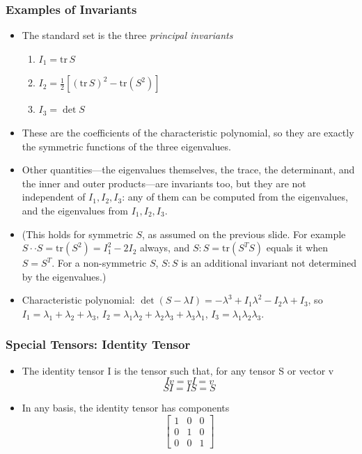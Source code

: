 \documentclass[aspectratio=169,11pt]{beamer}
\begin{document}
\begin{frame}
\frametitle{Examples of Invariants}
\begin{itemize}
    \item The standard set is the three \emph{principal invariants}
    \begin{enumerate}
        \item \(I_1 = \mathrm{tr}\,S\)
        \item \(I_2 = \tfrac{1}{2}\left[(\mathrm{tr}\,S)^2 - \mathrm{tr}(S^2)\right]\)
        \item \(I_3 = \det S\)
    \end{enumerate}
    \item These are the coefficients of the characteristic polynomial, so they are exactly the symmetric functions of the three eigenvalues.
    \item Other quantities—the eigenvalues themselves, the trace, the determinant, and the inner and outer products—are invariants too, but they are not independent of \(I_1, I_2, I_3\): any of them can be computed from the eigenvalues, and the eigenvalues from \(I_1, I_2, I_3\).
    \item (This holds for symmetric \(S\), as assumed on the previous slide. For example \(S\cdot\cdot S = \mathrm{tr}(S^2) = I_1^2 - 2I_2\) always, and \(S:S = \mathrm{tr}(S^TS)\) equals it when \(S=S^T\). For a non-symmetric \(S\), \(S:S\) is an additional invariant not determined by the eigenvalues.)
    \item Characteristic polynomial: \(\det(S-\lambda I) = -\lambda^3 + I_1\lambda^2 - I_2\lambda + I_3\), so \(I_1=\lambda_1+\lambda_2+\lambda_3\), \(I_2=\lambda_1\lambda_2+\lambda_2\lambda_3+\lambda_3\lambda_1\), \(I_3=\lambda_1\lambda_2\lambda_3\).
\end{itemize}
\end{frame}

\begin{frame}
\frametitle{Special Tensors: Identity Tensor}
\begin{itemize}
    \item The identity tensor I is the tensor such that, for any tensor S or vector v
    \[
    I v = v I = v
    \]
    \[
    S I = I S = S
    \]
    \item In any basis, the identity tensor has components
    \[
    \begin{bmatrix}
        1 & 0 & 0 \\
        0 & 1 & 0 \\
        0 & 0 & 1
    \end{bmatrix}
    \]
\end{itemize}
\end{frame}
\end{document}
